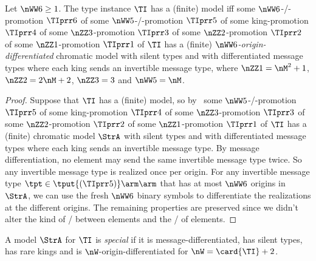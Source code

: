 \begin{remark}\label{rem:diff-msg-tp}
Let $\nWW6\geq1$.
The type instance $\TI$ has a (finite) model
iff some $\nWW6$-\twotype/-promotion $\TIprr6$
of some $\nWW5$-\twotype/-promotion $\TIprr5$
of some king-promotion $\TIprr4$
of some $\nZZ3$-promotion $\TIprr3$
of some $\nZZ2$-promotion $\TIprr2$
of some $\nZZ1$-promotion $\TIprr1$ 
of $\TI$ has a (finite) \emph{$\nWW6$-origin-differentiated} chromatic model
with silent types and with differentiated message types 
where each king sends an invertible message type,
where $\nZZ1 = \nM^2+1$, $\nZZ2 = 2\nM+2$, $\nZZ3 = 3$ and $\nWW5 = \nM$.
\end{remark}
\begin{proof}
Suppose that $\TI$ has a (finite) model, so by~
some $\nWW5$-\twotype/-promotion $\TIprr5$
of some king-promotion $\TIprr4$
of some $\nZZ3$-promotion $\TIprr3$
of some $\nZZ2$-promotion $\TIprr2$
of some $\nZZ1$-promotion $\TIprr1$ 
of $\TI$ has a (finite) chromatic model $\StrA$ with silent types and with
differentiated message types where each king sends an invertible message type.
By message differentiation, no element may send the same invertible message type
twice.
So any invertible message type is realized once per origin.
For any invertible message type $\tpt\in\tput{(\TIprr5)}\arm\arm$ that has at
most $\nWW6$ origins in $\StrA$, we can use the fresh $\nWW6$ binary symbols to
differentiate the realizations at the different origins.
The remaining properties are preserved since we didn't alter the kind of
\twotypes/ between elements and the \onetypes/ of elements.
\end{proof}

\begin{definition}
A model $\StrA$ for $\TI$ is \emph{special} if it is message-differentiated, has
silent types, has rare kings and is $\nW$-origin-differentiated for $\nW =
\card{\TI}+2$.
\end{definition}
